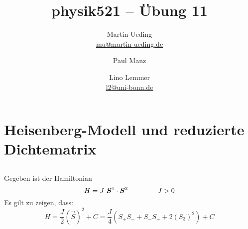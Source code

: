 

\title{physik521 – Übung 11}
\author{
	Martin Ueding \\ \small{\href{mailto:mu@martin-ueding.de}{mu@martin-ueding.de}}
        \and Paul Manz
        \and Lino Lemmer \\ \small{\href{mailto:l2@uni-bonn.de}{l2@uni-bonn.de}}
}

\pagestyle{plain}

\newcommand\kB{k_\text B}
\newcommand\muB{\mu_\text B}



\maketitle



\section{Heisenberg-Modell und reduzierte Dichtematrix}
\subsection{}
Gegeben ist der Hamiltonian
\[H = J \ \vec{S}^1 \cdot \vec{S}^2 \hspace{1.5cm} J>0 \]
Es gilt zu zeigen, dass:
\[H= \frac{J}{2}(\vec{S})^2 + C = \frac{J}{4}(S_+S_-+S_-S_++2(S_3)^2)+C\]

